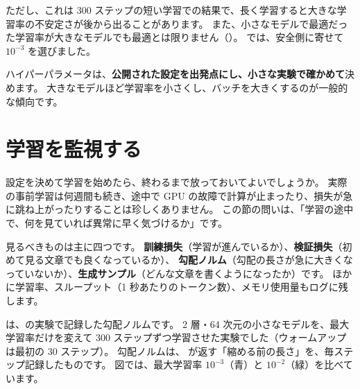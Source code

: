 ただし、これは 300 ステップの短い学習での結果で、長く学習すると大きな学習率の不安定さが後から出ることがあります。
また、小さなモデルで最適だった学習率が大きなモデルでも最適とは限りません（）。
 では、安全側に寄せて $10^{-3}$ を選びました。

ハイパーパラメータは、\textbf{公開された設定を出発点にし、小さな実験で確かめて}決めます。
大きなモデルほど学習率を小さくし、バッチを大きくするのが一般的な傾向です。

\section{学習を監視する}\label{sec:pt-monitor}

設定を決めて学習を始めたら、終わるまで放っておいてよいでしょうか。
実際の事前学習は何週間も続き、途中で GPU の故障で計算が止まったり、損失が急に跳ね上がったりすることは珍しくありません。
この節の問いは、「学習の途中で、何を見ていれば異常に早く気づけるか」です。

見るべきものは主に四つです。
\textbf{訓練損失}（学習が進んでいるか）、\textbf{検証損失}（初めて見る文章でも良くなっているか）、
\textbf{勾配ノルム}（勾配の長さが急に大きくなっていないか）、\textbf{生成サンプル}（どんな文章を書くようになったか）です。
ほかに学習率、スループット（1 秒あたりのトークン数）、メモリ使用量もログに残します。

は、の実験で記録した勾配ノルムです。
2 層・64 次元の小さなモデルを、最大学習率だけを変えて 300 ステップずつ学習させた実験でした（ウォームアップは最初の 30 ステップ）。
勾配ノルムは、 が返す「縮める前の長さ」を、毎ステップ記録したものです。
図では、最大学習率 $10^{-3}$（青）と $10^{-2}$（緑）を比べています。

